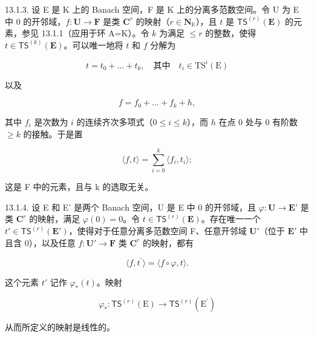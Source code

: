 13.1.3. 设 E 是 K 上的 Banach 空间，F 是 K 上的分离多范数空间。令 U 为 E 中 0 的开邻域，\(f\colon\mathbf{U}\to\mathbf{F}\) 是类 \(\mathbf{C}^{r}\) 的映射（\(r\in\mathbf{N}_{\mathbb{K}}\)），且 \(t\) 是 \(\mathsf{TS}^{(r)}(\mathbf{E})\) 的元素，参见 13.1.1（应用于环 A=K）。令 \(k\) 为满足 \(\leqslant r\) 的整数，使得 \(t\in\mathsf{TS}^{(k)}(\mathbf{E})\)。可以唯一地将 \(t\) 和 \(f\) 分解为

\[
t=t_{0}+\dots+t_{k},\quad\text{其中}\quad t_{i}\in\mathrm{TS}^{i}(\mathrm{E})
\]

以及

\[
f = f _ {0} + \dots + f _ {k} + h,
\]

其中 \(f_i\) 是次数为 \(i\) 的连续齐次多项式（\(0 \leqslant i \leqslant k\)），而 \(h\) 在点 0 处与 0 有阶数 \(\geqslant k\) 的接触。于是置

\[
\langle f, t \rangle = \sum_ {i = 0} ^ {k} \langle f _ {i}, t _ {i} \rangle ;
\]

这是 F 中的元素，且与 k 的选取无关。

13.1.4. 设 E 和 E' 是两个 Banach 空间，U 是 E 中 0 的开邻域，且 \(\varphi\colon\mathbf{U}\to\mathbf{E}'\) 是类 \(\mathbf{C}^{r}\) 的映射，满足 \(\varphi(0)=0\)。令 \(t\in\mathsf{TS}^{(r)}(\mathbf{E})\)。存在唯一一个 \(t'\in\mathsf{TS}^{(r)}(\mathbf{E}')\)，使得对于任意分离多范数空间 F、任意开邻域 \(\mathbf{U}'\)（位于 \(\mathbf{E}'\) 中且含 0），以及任意 \(f\colon\mathbf{U}'\to\mathbf{F}\) 类 \(\mathbf{C}^{r}\) 的映射，都有

\[
\langle f, t ^ {\prime} \rangle = \langle f \circ \varphi , t \rangle .\tag{*}
\]

这个元素 \(t'\) 记作 \(\varphi_{*}(t)\)。映射

\[
\varphi_ {*} \colon \mathsf {T S} ^ {(r)} (\mathrm{E}) \to \mathsf {T S} ^ {(r)} (\mathrm{E} ^ {\prime})
\]

从而所定义的映射是线性的。
\relax{}

